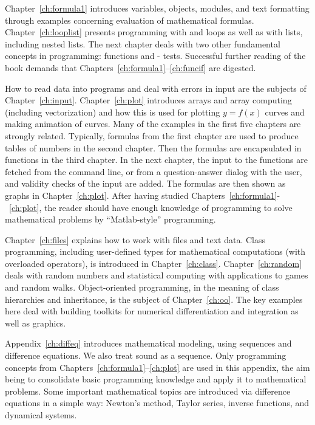Chapter~\ref{ch:formula1} introduces variables, objects, modules, and
text formatting through examples concerning evaluation of mathematical
formulas.  Chapter~\ref{ch:looplist} presents programming with 
and  loops as well as with lists, including nested lists.
The next chapter deals with two other fundamental concepts in
programming: functions and - tests. Successful
further reading of the book demands that Chapters~\ref{ch:formula1}--\ref{ch:funcif} are digested.

How to read data into programs and deal with errors in input are the
subjects of Chapter~\ref{ch:input}.  Chapter~\ref{ch:plot} introduces
arrays and array computing (including vectorization) and how this is
used for plotting $y=f(x)$ curves and making animation of curves.
Many of the examples in the first five chapters are strongly
related. Typically, formulas from the first chapter are used to
produce tables of numbers in the second chapter.  Then the formulas
are encapsulated in functions in the third chapter. In the
next chapter, the input to the
functions are fetched from the command line, or from a question-answer
dialog with the user, and validity checks of the input
are added.  The formulas are then shown as graphs in Chapter~\ref{ch:plot}.
After having studied
Chapters~\ref{ch:formula1}-~\ref{ch:plot}, the reader should have
enough knowledge of programming to solve mathematical problems by
``Matlab-style'' programming.


Chapter~\ref{ch:files} explains how to work with files
and text data.
Class programming, including
user-defined types for
mathematical computations (with overloaded operators),
is introduced in Chapter~\ref{ch:class}.
Chapter~\ref{ch:random} deals with random numbers and statistical
computing with applications to games and random walks.
Object-oriented programming, in the meaning of class hierarchies and
inheritance,
is the subject of Chapter~\ref{ch:oo}. The key examples here
deal with building toolkits for
numerical differentiation and integration as well as graphics.

Appendix~\ref{ch:diffeq} introduces mathematical modeling, using
sequences and difference equations. We also treat sound
as a sequence. Only programming concepts from Chapters~\ref{ch:formula1}--\ref{ch:plot} are used in this appendix,
the aim being to consolidate basic programming knowledge
and apply it to mathematical problems. Some important mathematical
topics are introduced via difference equations in a simple way:
Newton's method, Taylor
series, inverse functions, and dynamical systems.

